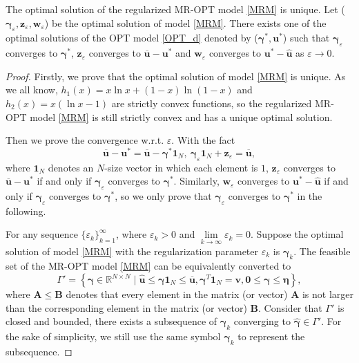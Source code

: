 \documentclass[review,hidelinks,onefignum,onetabnum]{siamart220329}
\begin{document}
\begin{theorem}
	The optimal solution of the regularized MR-OPT model \cref{MRM} is unique. Let ($\bm{\gamma}_{\varepsilon}, \bm{z}_{\varepsilon}, \bm{w}_{\varepsilon}$) be the optimal solution of model \cref{MRM}. There exists one of the optimal solutions of the OPT model \cref{OPT_d} denoted by ($\bm{\gamma}^*,\bm{ u}^*$) such that $\bm{\gamma}_{\varepsilon}$ converges to $\bm{\gamma}^*$, $\bm{z}_{\varepsilon}$ converges to $\bm{\overline{u}}-\bm{u}^*$ and $\bm{w}_{\varepsilon}$ converges to $\bm{u}^*-\bm{\hat{u}}$ as $\varepsilon\rightarrow 0$. 
\end{theorem}
\begin{proof}
	Firstly, we prove that the optimal solution of model \cref{MRM} is unique. As we all know, $h_1(x)=x\ln x+(1-x)\ln (1-x)$ and  $h_2(x)=x(\ln x -1)$ are strictly convex functions, so the regularized MR-OPT model \cref{MRM} is still strictly convex and has a unique optimal solution. 

    Then we prove the convergence w.r.t. $\varepsilon$. With the fact
    \begin{equation*}
        \bm{\overline{u}}-\bm{u}^*=\bm{\overline{u}}-\bm{\gamma}^* \bm{1}_N, \ \bm{\gamma}_{\varepsilon} \bm{1}_N + \bm{z}_{\varepsilon} = \bm{\overline{u}}, 
    \end{equation*}
    where $\bm{1}_N$ denotes an $N$-size vector in which each element is $1$, $\bm{z}_{\varepsilon}$ converges to $\bm{\overline{u}}-\bm{u}^*$ if and only if $\bm{\gamma}_{\varepsilon}$ converges to $\bm{\gamma}^*$. 
    Similarly, $\bm{w}_{\varepsilon}$ converges to $\bm{u}^*-\bm{\hat{u}}$ if and only if $\bm{\gamma}_{\varepsilon}$ converges to $\bm{\gamma}^*$, so we only prove that $\bm{\gamma}_{\varepsilon}$ converges to $\bm{\gamma}^*$ in the following. 
     
 For any sequence $\{\varepsilon_k\}_{k=1}^{\infty}$, where $\varepsilon_k>0$ and $\lim\limits_{k\rightarrow \infty} \varepsilon_k=0$. Suppose the optimal solution of model \cref{MRM} with the regularization parameter $\varepsilon_k$ is $\bm{\gamma}_k$. 
 The feasible set of the MR-OPT model \cref{MRM} can be equivalently converted to 
 $$\Gamma' = \left\{\bm{\gamma}\in \mathbb{R}^{N\times N} \mid \bm{\hat{u}}\leq \bm{\gamma}\bm{1}_N \leq  \bm{\overline{u}}, \bm{\gamma}^{T} \bm{1}_N=\bm{v}, \bm{0} \leq \bm{\gamma} \leq \bm{\eta} \right\}, $$
 where $\bm{A} \leq \bm{B}$ denotes that every element in the matrix (or vector) $\bm{A}$ is not larger than the corresponding element in the matrix (or vector) $\bm{B}$. 
 Consider that $\Gamma'$ is closed and bounded, there exists a subsequence of $\bm{\gamma}_k$ converging to $\hat{\bm{\gamma}}\in \Gamma'$. For the sake of simplicity, we still use the same symbol $\bm{\gamma}_k$ to represent the subsequence.
 

\end{proof}
\end{document}
